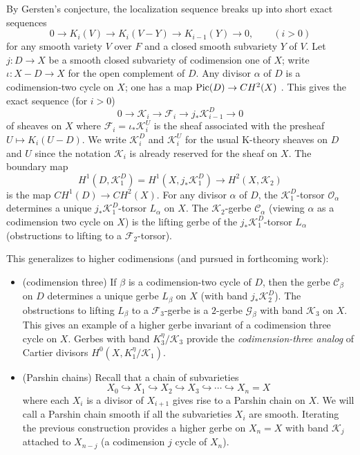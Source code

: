 \documentclass{amsart}
\numberwithin{equation}{subsection}
\theoremstyle{remark}
\theoremstyle{remark}
\newcommand{\too}{\longrightarrow}%
\newcommand{\cC}{\mathcal{C}}
\newcommand{\cF}{\mathcal{F}}
\newcommand{\cG}{\mathcal{G}}
\newcommand{\cK}{\mathcal{K}}
\newcommand{\cO}{\mathcal{O}}
\begin{document}
By Gersten's conjecture, the localization sequence \cite[\S7 Proposition 3.2]{Quillen}  breaks up into short exact sequences
\begin{equation*}
  0 \too K_i(V) \too K_i(V-Y) \too K_{i-1}(Y) \too 0, \qquad (i> 0)
\end{equation*}
for any smooth variety $V$ over $F$ and a closed smooth subvariety $Y$ of $V$.
Let $j:D \to X $ be a smooth closed subvariety of codimension one of $X$; write $\iota: X -D \to X$ for the open complement of $D$. Any divisor $\alpha$ of $D$ is a codimension-two cycle on $X$; one has a map ${\rm Pic}(D) \to CH^2(X)$ \cite[(iii), p.~269]{Bloch2}. 
This gives the exact sequence (for $i>0$)
\begin{equation*}
   0 \too \cK_i \too \cF_i \too j_* \cK^D_{i-1} \too 0
\end{equation*}
of sheaves on $X$ where $\cF_i = \iota_*\cK^U_i$ is the sheaf associated with the presheaf $U \mapsto K_i(U-D)$. We write $\cK_i^D$ and $\cK_i^U$ for the usual K-theory sheaves on $D$ and $U$ since the notation $\cK_i$ is already reserved for the sheaf on $X$.  
The boundary map
\begin{equation*}
  H^1(D, \cK^D_1) = H^1(X, j_*\cK^D_1) \too H^2(X, \cK_2)
\end{equation*}
is the map $CH^1(D) \to CH^2(X)$. For any divisor $\alpha$ of $D$, the $\cK^D_1$-torsor $\cO_{\alpha}$ determines a unique $j_*\cK^D_1$-torsor $L_{\alpha}$ on $X$. The $\cK_2$-gerbe $\cC_{\alpha}$ (viewing $\alpha$ as a codimension two cycle on $X$) is the lifting gerbe of the $j_*\cK^D_1$-torsor $L_{\alpha}$ (obstructions to lifting to a $\cF_2$-torsor). 

This generalizes to higher codimensions (and pursued in forthcoming work):
\begin{itemize} 
\item  (codimension three) If $\beta$ is a codimension-two cycle of $D$, then the gerbe $\cC_{\beta}$ on $D$ determines a unique gerbe $L_{\beta}$ on $X$ (with band $j_*\cK^D_2$). The obstructions to lifting $L_{\beta}$ to a $\cF_3$-gerbe is a $2$-gerbe $\cG_{\beta}$ \cite{Breen94} with band $\cK_3$ on $X$. This gives an example of a higher gerbe invariant of a codimension three cycle on $X$. Gerbes with band $K_3^{\eta}/{\cK_3}$ provide the {\it codimension-three analog} of Cartier divisors $H^0(X, K_1^{\eta}/{\cK_1})$.

\item (Parshin chains) Recall that a chain of subvarieties
  \begin{equation*}
    X_0 \hookrightarrow X_1 \hookrightarrow X_2  \hookrightarrow X_3 \hookrightarrow \cdots  \hookrightarrow X_n = X
  \end{equation*}
  where each $X_i$ is a divisor of $X_{i+1}$ gives rise to a Parshin chain on $X$. We will call  a Parshin chain smooth if all the subvarieties $X_i$ are smooth. Iterating the previous construction provides a higher gerbe on $X_n=X$ with band $\cK_j$ attached to $X_{n-j}$  (a codimension $j$ cycle of $X_n$). 
 \end{itemize}
\end{document}
